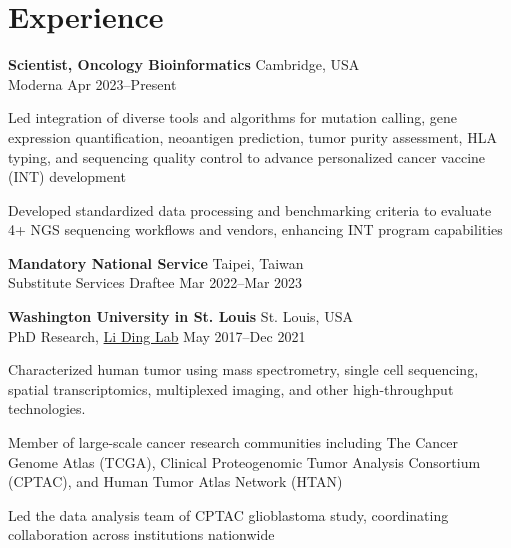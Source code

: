 \section{Experience}
\begin{entrylist}

\item \textbf{Scientist, Oncology Bioinformatics} \hfill Cambridge, USA\\
Moderna \hfill
Apr 2023--Present
\begin{detaillist}
    \item Led integration of diverse tools and algorithms for mutation calling, gene expression quantification, neoantigen prediction, tumor purity assessment, HLA typing, and sequencing quality control to advance personalized cancer vaccine (INT) development
    \item Developed standardized data processing and benchmarking criteria to evaluate 4+ NGS sequencing workflows and vendors, enhancing INT program capabilities
\end{detaillist}

\item \textbf{Mandatory National Service} \hfill Taipei, Taiwan\\
Substitute Services Draftee \hfill
Mar 2022--Mar 2023

\item \textbf{Washington University in St. Louis} \hfill St. Louis, USA\\
PhD Research, \href{https://dinglab.wustl.edu/}{Li Ding Lab} \hfill
May 2017--Dec 2021
\begin{detaillist}
    \item Characterized human tumor using mass spectrometry, single cell sequencing, spatial transcriptomics, multiplexed imaging, and other high-throughput technologies.
    \item Member of large-scale cancer research communities including The Cancer Genome Atlas (TCGA), Clinical Proteogenomic Tumor Analysis Consortium (CPTAC), and Human Tumor Atlas Network (HTAN)
    \item Led the data analysis team of CPTAC glioblastoma study, coordinating collaboration across institutions nationwide
\end{detaillist}


\end{entrylist}
